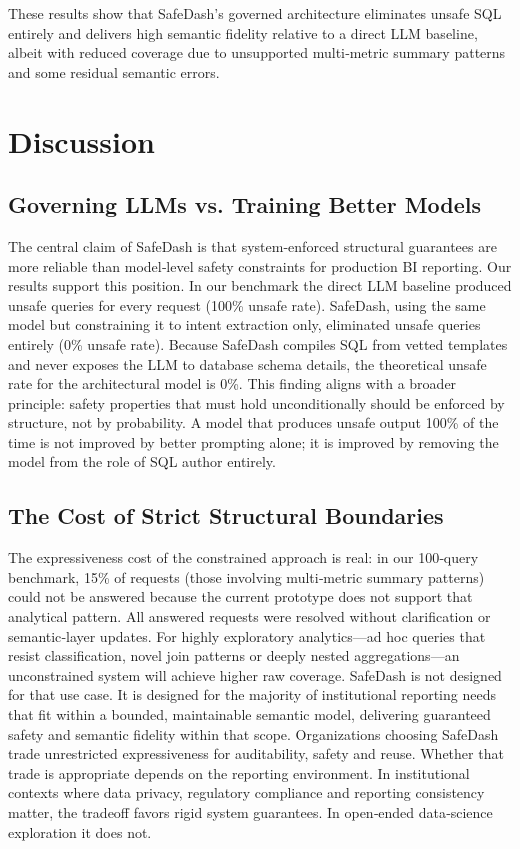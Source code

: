 \documentclass[11pt]{article}
\begin{document}
These results show that SafeDash’s governed architecture eliminates unsafe SQL entirely and delivers high semantic fidelity relative to a direct LLM baseline, albeit with reduced coverage due to unsupported multi‑metric summary patterns and some residual semantic errors.

\section{Discussion}
\subsection{Governing LLMs vs. Training Better Models}
The central claim of SafeDash is that system-enforced structural guarantees are more reliable than model‑level safety constraints for production BI reporting. Our results support this position. In our benchmark the direct LLM baseline produced unsafe queries for every request (100\% unsafe rate). SafeDash, using the same model but constraining it to intent extraction only, eliminated unsafe queries entirely (0\% unsafe rate). Because SafeDash compiles SQL from vetted templates and never exposes the LLM to database schema details, the theoretical unsafe rate for the architectural model is 0\%. This finding aligns with a broader principle: safety properties that must hold unconditionally should be enforced by structure, not by probability. A model that produces unsafe output 100\% of the time is not improved by better prompting alone; it is improved by removing the model from the role of SQL author entirely.

\subsection{The Cost of Strict Structural Boundaries}
The expressiveness cost of the constrained approach is real: in our 100‑query benchmark, 15\% of requests (those involving multi‑metric summary patterns) could not be answered because the current prototype does not support that analytical pattern. All answered requests were resolved without clarification or semantic‑layer updates. For highly exploratory analytics—ad hoc queries that resist classification, novel join patterns or deeply nested aggregations—an unconstrained system will achieve higher raw coverage. SafeDash is not designed for that use case. It is designed for the majority of institutional reporting needs that fit within a bounded, maintainable semantic model, delivering guaranteed safety and semantic fidelity within that scope. Organizations choosing SafeDash trade unrestricted expressiveness for auditability, safety and reuse. Whether that trade is appropriate depends on the reporting environment. In institutional contexts where data privacy, regulatory compliance and reporting consistency matter, the tradeoff favors rigid system guarantees. In open‑ended data‑science exploration it does not.
\end{document}
